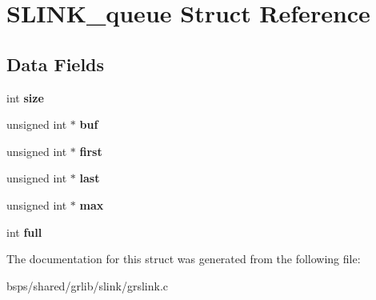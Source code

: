 \hypertarget{structSLINK__queue}{}\section{S\+L\+I\+N\+K\+\_\+queue Struct Reference}
\label{structSLINK__queue}
\subsection*{Data Fields}
\begin{DoxyCompactItemize}
\item 
\mbox{\label{structSLINK__queue_a7075c8127254170f6e17ad213e996ad3}} 
int {\bfseries size}
\item 
\mbox{\label{structSLINK__queue_a2088f50b8daed45369d4bdae978266bb}} 
unsigned int $\ast$ {\bfseries buf}
\item 
\mbox{\label{structSLINK__queue_a30028f7467e6f52d3ff950d20c46cf92}} 
unsigned int $\ast$ {\bfseries first}
\item 
\mbox{\label{structSLINK__queue_a21b20f1ff40b240232bfcd37af9a002a}} 
unsigned int $\ast$ {\bfseries last}
\item 
\mbox{\label{structSLINK__queue_a80d39c84d09a8b7af349c96eab44ef20}} 
unsigned int $\ast$ {\bfseries max}
\item 
\mbox{\label{structSLINK__queue_a8a16495983a9b9d507a0325822777657}} 
int {\bfseries full}
\end{DoxyCompactItemize}


The documentation for this struct was generated from the following file\+:\begin{DoxyCompactItemize}
\item 
bsps/shared/grlib/slink/grslink.\+c\end{DoxyCompactItemize}
